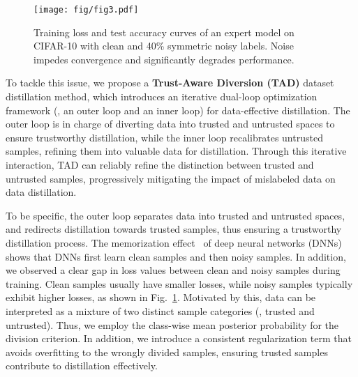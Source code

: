 \begin{figure}[t]
    \centering
    \texttt{[image: fig/fig3.pdf]}
    \vspace{-1em}
    \caption{
    Training loss and test accuracy curves of an expert model on CIFAR-10 with clean and 40\% symmetric noisy labels. 
    Noise impedes convergence and significantly degrades performance.
   }
   \vspace{-1em}
    \label{fig2}
\end{figure}

To tackle this issue, we propose a \textbf{Trust-Aware Diversion (TAD)} dataset distillation method, which introduces an iterative dual-loop optimization framework (\ie, an outer loop and an inner loop) for data-effective distillation. 
The outer loop is in charge of diverting data into trusted and untrusted spaces to ensure trustworthy distillation, while the inner loop recalibrates untrusted samples, refining them into valuable data for distillation.
Through this iterative interaction, TAD can reliably refine the distinction between trusted and untrusted samples, progressively mitigating the impact of mislabeled data on data distillation.


To be specific, the outer loop separates data into trusted and untrusted spaces, and redirects distillation towards trusted samples, thus ensuring a trustworthy distillation process.
The memorization effect~\cite{arpit2017closer,yao2020searching} of deep neural networks (DNNs) shows that DNNs first learn clean samples and then noisy samples. 
In addition, we observed a clear gap in loss values between clean and noisy samples during training. 
Clean samples usually have smaller losses, while noisy samples typically exhibit higher losses, as shown in Fig.~\ref{fig2}.
Motivated by this, data can be interpreted as a mixture of two distinct sample categories (\ie, trusted and untrusted).
Thus, we employ the class-wise mean posterior probability for the division criterion.
In addition, we introduce a consistent regularization term that avoids overfitting to the wrongly divided samples, ensuring trusted samples contribute to distillation effectively.


